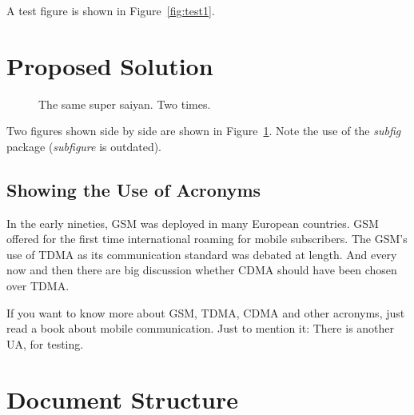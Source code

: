 A test figure is shown in Figure~\ref{fig:test1}.

\section{Proposed Solution} 

\blindtext
\blindtext

\begin{figure}[!ht]
    \centering
    \qquad
    \caption[Short Caption]{The same super saiyan. Two times.}        
    \label{fig:test2}
\end{figure}

Two figures shown side by side are shown in Figure~\ref{fig:test2}.  Note the use of the \textit{subfig} package (\textit{subfigure} is outdated).

\subsection{Showing the Use of Acronyms}

In the early nineties, \acs{GSM} was deployed in many European countries. \ac{GSM} offered for the first time international roaming for mobile subscribers. The \acs{GSM}’s use of \ac{TDMA} as its communication standard was debated at length. And every now and then there are big discussion whether \ac{CDMA} should have been chosen over \ac{TDMA}.

If you want to know more about \acf{GSM}, \acf{TDMA}, \acf{CDMA} and other acronyms, just read a book about mobile communication. Just to mention it: There is another \ac{UA}, for testing.


\section{Document Structure}

\blindtext
